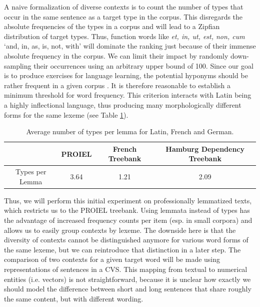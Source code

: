 \documentclass[oneside]{book}
\begin{document}
A naive formalization of diverse contexts is to count the number of types that occur in the same sentence as a target type in the corpus. This disregards the absolute frequencies of the types in a corpus and will lead to a Zipfian distribution \parencite[VI]{zipfPsychobiologyLanguageIntroduction1936} of target types. Thus, function words like \textit{et, in, ut, est, non, cum} `and, in, as, is, not, with' will dominate the ranking just because of their immense absolute frequency in the corpus. We can limit their impact by randomly down-sampling their occurrences using an arbitrary upper bound of 100.
\label{high_frequency_hyponyms_for_language_learning}
Since our goal is to produce exercises for language learning, the potential hyponyms should be rather frequent in a given corpus \parencites[27]{ellisUsagebasedLanguageInvestigating2013}[2]{robillardMonolingualBilingualChildren2014}. It is therefore reasonable to establish a minimum threshold for word frequency. This criterion interacts with Latin being a highly inflectional language, thus producing many morphologically different forms for the same lexeme (see Table \ref{tableTypesPerLemma}).
\begin{table}[ht]
	\begin{tabular}{ c | c | c | c }
  		 & PROIEL & French Treebank & Hamburg Dependency Treebank \\ \hline
  		Types per Lemma & 3.64 & 1.21 & 2.09 \\
	\end{tabular}
	\caption{Average number of types per lemma for Latin, French and German.}
	\label{tableTypesPerLemma}
\end{table}

Thus, we will perform this initial experiment on professionally lemmatized texts, which restricts us to the PROIEL treebank. Using lemmata instead of types has the advantage of increased frequency counts per item (esp. in small corpora) and allows us to easily group contexts by lexeme. The downside here is that the diversity of contexts cannot be distinguished anymore for various word forms of the same lexeme, but we can reintroduce that distinction in a later step. The comparison of two contexts for a given target word will be made using representations of sentences in a \gls{CVS}. This mapping from textual to numerical entities (i.e. vectors) is not straightforward, because it is unclear how exactly we should model the difference between short and long sentences that share roughly the same content, but with different wording. 
\end{document}
